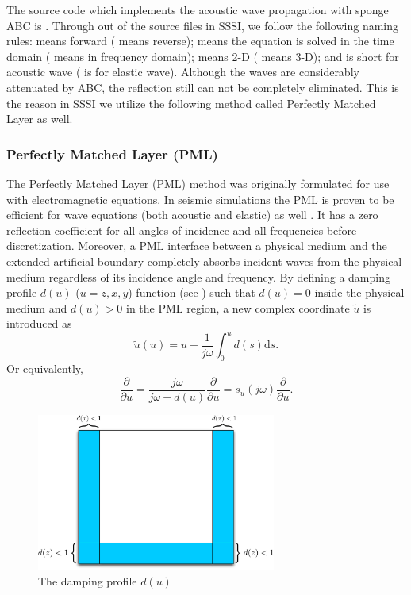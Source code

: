 \documentclass[11pt]{article}
\theoremstyle{plain}
\theoremstyle{definition}
\theoremstyle{remark}
\numberwithin{equation}{section}
\begin{document}
The source code which implements the acoustic wave propagation with sponge ABC 
is . Through out of the source files in SSSI,  we follow the following naming rules:  means forward ( means reverse);  means the equation is solved in the time domain ( means in frequency domain);  means 2-D ( means 3-D); and  is short
 for acoustic wave ( is for elastic wave).  Although the waves are considerably attenuated by ABC, the reflection still can not be completely eliminated. This is the reason in SSSI we utilize the following method called Perfectly Matched Layer as well. 



\subsubsection{Perfectly Matched Layer (PML)}
The Perfectly Matched Layer (PML) method was originally formulated for use with electromagnetic equations. In seismic simulations the PML is proven to be efficient for wave equations (both acoustic and elastic) as well \cite{Komatitsch:2007aa}. It has a zero reflection coefficient for all angles of incidence and all frequencies before discretization. Moreover, a PML interface between a physical medium and the extended artificial boundary completely absorbs incident waves from the physical medium regardless of its incidence angle and frequency.
By defining a damping profile $d(u)$ ($u=z, x, y$) function (see ) such that $d(u) = 0$ inside the physical medium and $d(u) > 0$ in the PML region, a new complex coordinate $\tilde{u}$ is introduced as
  \begin{equation}
  \label{eq:replace}
  \tilde{u}(u) = u + \frac{1}{j\omega}\int_0^u d(s)\mathrm{d}s.
  \end{equation}
Or equivalently,
  \begin{equation}
  \frac{\partial}{\partial \tilde{u}} = \frac{j\omega}{j\omega + d(u)}\frac{\partial}{\partial u} = s_u(j\omega)\frac{\partial}{\partial u}.
  \end{equation} 
  
\begin{figure}[htbp]
\centering
\includegraphics[width=0.7\textwidth]{Fig/SpongeABC.pdf}
\caption{The damping profile $d(u)$}
\end{figure}
\end{document}
